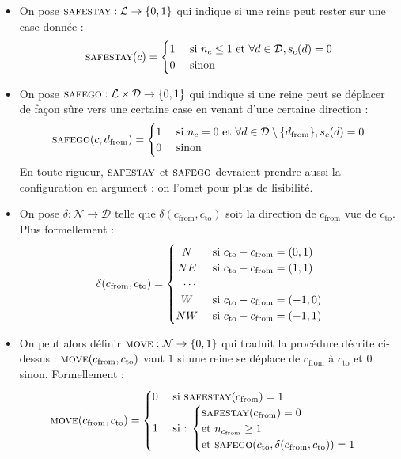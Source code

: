\documentclass[11pt, openany]{article}
\newcommand{\La}{\mathcal{L}}
\newcommand{\Ne}{\mathcal{N}}
\newcommand{\D}{\mathcal{D}}
\newcommand{\Ss}{\textsc{safestay}}
\newcommand{\Sg}{\textsc{safego}}
\newcommand{\M}{\textsc{move}}
\begin{document}
 \begin{itemize}
  \item{On pose $\Ss : {\La}\to\{0,1\}$ qui indique si une reine peut rester sur une case donnée : \[
 \Ss(c) =
  \begin{cases} 
      \hfill 1    \hfill & \text{ si $n_c\leq 1$ et $\forall d \in \D, s_c(d)=0$} \\
      \hfill 0 \hfill & \text{ sinon} \\
  \end{cases}
\]}
 
  \item{On pose $\Sg :  {\La\times\D}\to\{0,1\}$ qui indique si une reine peut se déplacer de façon sûre vers une certaine case en venant d'une certaine direction : \[
 \Sg(c, d_{\mathrm {from}}) =
  \begin{cases} 
      \hfill 1    \hfill & \text{ si $n_c=0$ et $\forall d \in \D\setminus\{d_{\mathrm{from}}\}, s_c(d)=0$} \\
      \hfill 0 \hfill & \text{ sinon} \\
  \end{cases}
\]
 En toute rigueur, $\Ss$ et $\Sg$ devraient prendre aussi la configuration en argument : on l'omet pour plus de lisibilité.
}
\medskip
  \item{On pose $\delta :\Ne\to\D$ telle que $\delta(c_{\mathrm{from}}, c_{\mathrm{to}})$ soit la direction de $c_{\mathrm{from}}$ vue de $c_{\mathrm{to}}$. Plus formellement : \[
 \delta(c_{\mathrm{from}}, c_{\mathrm{to}}) =
  \begin{cases} 
    \hfill N    \hfill & \text{ si $c_{\mathrm{to}}-c_{\mathrm{from}}=(0,1)$} \\
    \hfill NE \hfill & \text{ si  $c_{\mathrm{to}}-c_{\mathrm{from}}=(1,1)$} \\
    \hfill \cdots & \\
    \hfill W \hfill & \text{ si  $c_{\mathrm{to}}-c_{\mathrm{from}}= (-1,0)$}\\
    \hfill NW \hfill & \text { si  $c_{\mathrm{to}}-c_{\mathrm{from}}=(-1,1)$}\\
  \end{cases}
\] }
  \item{On peut alors définir $\M :{\Ne}\to\{0,1\}$ qui traduit la procédure décrite ci-dessus : $\M(c_{\mathrm{from}}, c_{\mathrm{to}})$ vaut $1$ si une reine se déplace de $c_{\mathrm{from}}$ à $c_{\mathrm{to}}$ et $0$ sinon. Formellement : \[
    \M(c_{\mathrm{from}}, c_{\mathrm{to}}) = 
    \begin{cases}
      \hfill 0 \hfill & \text{ si $\Ss(c_{\mathrm{from}})=1$} \\
      \hfill 1 \hfill & \text{ si : }{ \begin{cases} \Ss(c_{\mathrm{from}})=0 \\\text{et $n_{c_{\mathrm{from}}}\geq 1$} \\ \text{et } \Sg(c_{\mathrm{to}}, \delta(c_{\mathrm{from}}, c_{\mathrm{to}}))=1\\ \end{cases}}\\


\end{cases}\]}
\end{itemize}
\end{document}
